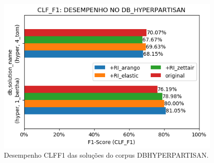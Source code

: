 \begin{figure}[ht]
    \centering
    \caption{Desempenho CLF\underscore{}F1 das soluções do corpus DB\underscore{}HYPERPARTISAN.}
    \vspace{-0.5cm}
    \begin{center}
        \includegraphics[scale=0.75]{img/clf-f1-bars-hyperpartisan.png}
    \end{center}
    \vspace{-0.5cm}
    \label{fig:clf-f1-bars-hyperpartisan}
\end{figure}